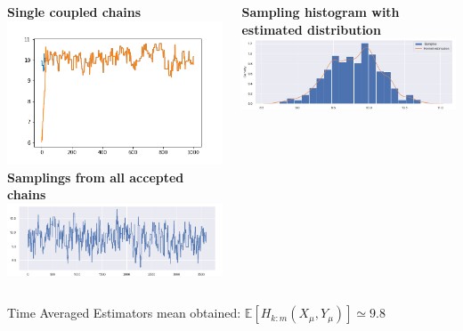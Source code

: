 \documentclass{beamer}
\begin{document}
\begin{frame}
\begin{columns}
	\begin{column}{0.49\textwidth}
		\centering
		{\scriptsize \textbf{Single coupled chains}}\\
		\vspace{-2mm}
		\includegraphics[width=0.85\columnwidth]{doublecoupling_chainmeeting/doublecoupling_mu_chain_meeting}
		\vspace{0.2cm}
		{	\scriptsize \textbf{Samplings from all accepted chains }}\\
		\includegraphics[width=\columnwidth]{doublecoupling_pack/doublecoupling_sampling_mu}
	\end{column}
	\begin{column}{0.49\textwidth}
		\centering
		{\scriptsize \textbf{Sampling histogram with estimated distribution}}\\
		\vspace{3mm}
		\includegraphics[width=\columnwidth]{doublecoupling_pack/doublecoupling_mu_histogram_kernel}
	\end{column}
\end{columns}
 \vspace{3mm}
	\small
	\centering
	Time Averaged Estimators mean obtained:	$ \mathbb{E}[H_{k:m}(X_{\mu}, Y_{\mu})] \simeq 9.8   %
	$
	
	
	
\end{frame}
\end{document}
